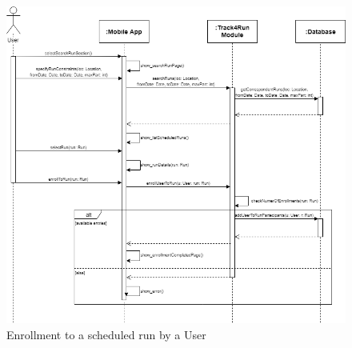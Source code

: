 \begin{figure}[H]
    \centering
    \includegraphics[scale=0.35]{DD/Pictures/enrollSeqDiagDD.png}
    \caption{Enrollment to a scheduled run by a User}
\end{figure}